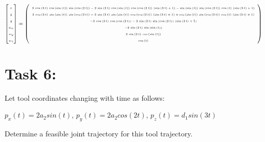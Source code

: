 \documentclass[12pt, a4paper]{report}
\begin{document}
{
\centering 
\begin{equation}
\fontsize{5}{12}\selectfont
        \begin{bmatrix}
                \dot{x}\\
                \dot{y}\\
                \dot{y} \\
                {w_x} \\
                {w_y} \\
                {w_z} \\
        \end{bmatrix}= 
\left(\begin{array}{c} 3\,\cos\left(3\,t\right)\,\cos\left(\sin\left(t\right)\right)\,\sin\left(\cos\left(2\,t\right)\right)-2\,\sin\left(2\,t\right)\,\cos\left(\sin\left(t\right)\right)\,\cos\left(\cos\left(2\,t\right)\right)\,\left(\sin\left(3\,t\right)+1\right)-\sin\left(\sin\left(t\right)\right)\,\sin\left(\cos\left(2\,t\right)\right)\,\cos\left(t\right)\,\left(\sin\left(3\,t\right)+1\right)\\ 3\,\cos\left(3\,t\right)\,\sin\left(\sin\left(t\right)\right)\,\sin\left(\cos\left(2\,t\right)\right)-2\,\sin\left(2\,t\right)\,\sin\left(\sin\left(t\right)\right)\,\cos\left(\cos\left(2\,t\right)\right)\,\left(\sin\left(3\,t\right)+1\right)+\cos\left(\sin\left(t\right)\right)\,\sin\left(\cos\left(2\,t\right)\right)\,\cos\left(t\right)\,\left(\sin\left(3\,t\right)+1\right)\\ -3\,\cos\left(3\,t\right)\,\cos\left(\cos\left(2\,t\right)\right)-2\,\sin\left(2\,t\right)\,\sin\left(\cos\left(2\,t\right)\right)\,\left(\sin\left(3\,t\right)+1\right)\\ -2\,\sin\left(2\,t\right)\,\sin\left(\sin\left(t\right)\right)\\ 2\,\sin\left(2\,t\right)\,\cos\left(\sin\left(t\right)\right)\\ \cos\left(t\right) \end{array}\right)
\fontsize{12}{12}\selectfont
\end{equation}
}

\section*{Task 6:}
Let tool coordinates changing with time as follows:

{\centering
$p_x(t) = 2a_2sin(t)$, $p_y(t) = 2a_2cos(2t)$, $p_z(t) = d_1sin(3t)$
}

Determine a feasible joint trajectory for this tool trajectory.
\end{document}
